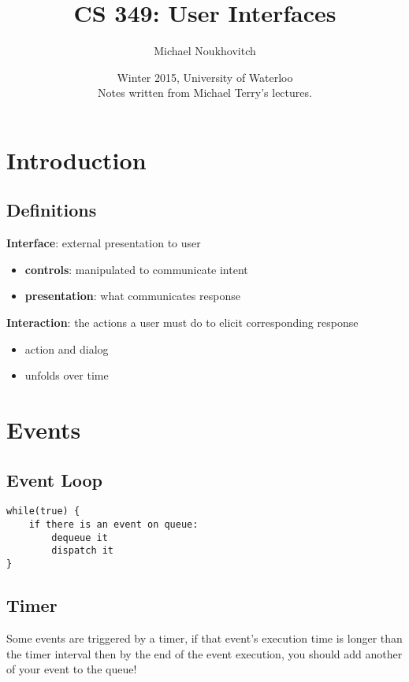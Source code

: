 \documentclass[]{article}
\theoremstyle{definition}
\begin{document}
	\let\ref\Cref

	\title{\bf{CS 349: User Interfaces}}
	\date{Winter 2015, University of Waterloo \\ \center Notes written from Michael Terry's lectures.}
	\author{Michael Noukhovitch}

	\maketitle
	\newpage
	\tableofcontents
	\newpage
	

	\section{Introduction}
		\subsection{Definitions}
			\textbf{Interface}: external presentation to user
			\begin{itemize}
				\item \textbf{controls}: manipulated to communicate intent
				\item \textbf{presentation}: what communicates response
			\end{itemize}
			\textbf{Interaction}: the actions a user must do to elicit corresponding response
			\begin{itemize}
				\item action and dialog
				\item unfolds over time
			\end{itemize}
	\section{Events}
		\subsection{Event Loop}
			\begin{lstlisting}
while(true) {
	if there is an event on queue:
		dequeue it 
		dispatch it
}
			\end{lstlisting}
		\subsection{Timer}
			Some events are triggered by a timer, if that event's execution time is longer than the timer interval 
			then by the end of the event execution, you should add another of your event to the queue!
\end{document}
